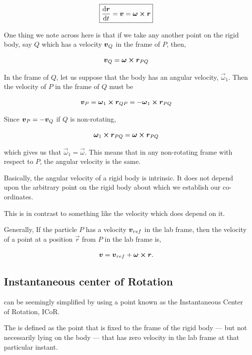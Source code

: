 \begin{equation}
    \boxed{\dv{\vec{r}}{t} = \vv = \vec{\omega} \cp \vec{r}} 
\end{equation}

One thing we note across here is that if we take any another point on 
the rigid body, say \(Q\) which has a velocity \(\boldsymbol{v}_Q\) in the frame of 
\(P\), then,

\[\vv_Q = \vec{\omega} \cp \vec{r}_{PQ}\]

In the frame of \(Q\), let us suppose that the body has an angular velocity, 
\(\vec{\omega}_1\). Then the velocity of \(P\) in the frame of \(Q\) must be 

\[\vv_P = \vec{\omega}_1 \cp \vec{r}_{QP} = -\vec{\omega}_1 \cp \vec{r}_{PQ}\]


Since \(\boldsymbol{v}_P = -\boldsymbol{v}_Q\) if \(Q\) is non-rotating,

\[\vec{\omega}_1 \cp \vec{r}_{PQ} = \vec{\omega} \cp \vec{r}_{PQ}\]

which gives us that \(\vec{\omega}_1 = \vec{\omega}\). This means that in any 
non-rotating frame with respect to \(P\), the angular velocity is the same.


Basically, the angular velocity of a rigid body is intrinsic. It does not depend upon
the arbitrary point on the rigid body about which we establish our co-ordinates.

This is in contrast to something like the velocity which does depend on it. 

Generally, If the particle \(P\) has a velocity \(\boldsymbol{v}_{ref}\) in the lab frame,
then the velocity of a point at a position \(\vec{r}\) from \(P\) in the lab 
frame is,

\begin{equation}
    \label{eq: velocity for rigid bodies}
    \vv = \vv_{ref} + \vec{\omega} \cp \vec{r}.
\end{equation}

\subsection{Instantaneous center of Rotation}

 can be seemingly simplified
by using a point known as the Instantaneous Center of Rotation, ICoR.

\begin{definition}
    The  is defined as the point that is fixed to the
    frame of the rigid body --- but not necessarily lying on the body --- that has
    zero velocity in the lab frame at that particular instant.
\end{definition}


